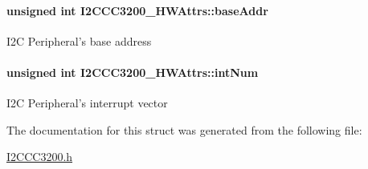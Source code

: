 \paragraph[{base\-Addr}]{\setlength{\rightskip}{0pt plus 5cm}unsigned int I2\-C\-C\-C3200\-\_\-\-H\-W\-Attrs\-::base\-Addr}\label{struct_i2_c_c_c3200___h_w_attrs_aad58884ee0e40e6b4eda27d212c0339b}
I2\-C Peripheral's base address 
\paragraph[{int\-Num}]{\setlength{\rightskip}{0pt plus 5cm}unsigned int I2\-C\-C\-C3200\-\_\-\-H\-W\-Attrs\-::int\-Num}\label{struct_i2_c_c_c3200___h_w_attrs_a944246733bda012f41d4eb1b9b4b3b8b}
I2\-C Peripheral's interrupt vector 

The documentation for this struct was generated from the following file\-:\begin{DoxyCompactItemize}
\item 
\hyperlink{_i2_c_c_c3200_8h}{I2\-C\-C\-C3200.\-h}\end{DoxyCompactItemize}
